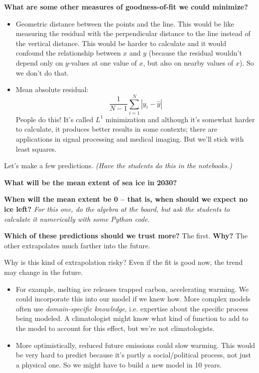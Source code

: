 \documentclass{article}
\begin{document}
\textbf{What are some other measures of goodness-of-fit we could minimize?}
\begin{itemize}
    \item Geometric distance between the points and the line. This would be like measuring the residual with the perpendicular distance to the line instead of the vertical distance. This would be harder to calculate and it would confound the relationship between $x$ and $y$ (because the residual wouldn't depend only on $y$-values at one value of $x$, but also on nearby values of $x$). So we don't do that.
    \item Mean absolute residual:
    \[
        \frac{1}{N - 1} \sum_{i = 1}^N |y_i - \hat y|
    \]
    People do this! It's called $L^1$ minimization and although it's somewhat harder to calculate, it produces better results in some contexts; there are applications in signal processing and medical imaging. But we'll stick with least squares.
\end{itemize}

Let's make a few predictions. \textit{(Have the students do this in the notebooks.)}

\textbf{What will be the mean extent of sea ice in 2030?}

\textbf{When will the mean extent be 0 -- that is, when should we expect no ice left?}
\textit{For this one, do the algebra at the board, but ask the students to calculate it numerically with some Python code.}

\textbf{Which of these predictions should we trust more?} The first. \textbf{Why?} The other extrapolates much farther into the future.

Why is this kind of extrapolation risky? Even if the fit is good now, the trend may change in the future.
\begin{itemize}
    \item For example, melting ice releases trapped carbon, accelerating warming. We could incorporate this into our model if we knew how. More complex models often use \emph{domain-specific knowledge}, i.e. expertise about the specific process being modeled. A climatologist might know what kind of function to add to the model to account for this effect, but we're not climatologists.
    \item More optimistically, reduced future emissions could slow warming. This would be very hard to predict because it's partly a social/political process, not just a physical one. So we might have to build a new model in 10 years.
\end{itemize}
\end{document}
